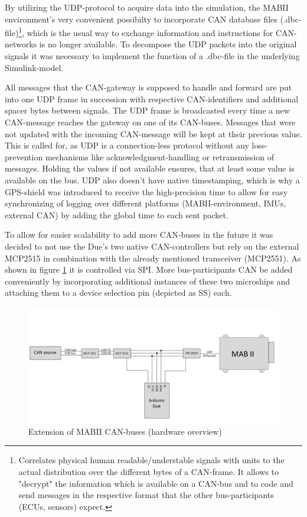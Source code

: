 \documentclass[ExampleMasters.tex]{subfiles}
\begin{document}
By utilizing the \gls{UDP}-protocol to acquire data into the simulation, the \gls{MABII} environment's very convenient possibilty to incorporate \gls{CAN} database files (.dbc-file)\footnote{Correlates physical human readable/understable signals with units to the actual distribution over the different bytes of a \gls{CAN}-frame. It allows to "decrypt" the information which is available on a \gls{CAN}-bus and to code and send messages in the respective format that the other bus-participants (ECUs, sensors) expect.}, which is the usual way to exchange information and instructions for \gls{CAN}-networks is no longer available. To decompose the \gls{UDP} packets into the original signals it was necessary to implement the function of a .dbc-file in the underlying Simulink-model. 

All messages that the CAN-gateway is supposed to handle and forward are put into one \gls{UDP} frame in succession with respective CAN-identifiers and additional spacer bytes between signals. The \gls{UDP} frame is broadcasted every time a new CAN-message reaches the gateway on one of its \gls{CAN}-buses. Messages that were not updated with the incoming \gls{CAN}-message will be kept at their previous value. This is called for, as \gls{UDP} is a connection-less protocol without any loss-prevention mechanisms like acknowledgment-handling or retransmission of messages. Holding the values if not available ensures, that at least some value is available on the bus. \gls{UDP} also doesn't have native timestamping, which is why a \gls{GPS}-shield was introduced to receive the high-precision time to allow for easy synchronizing of logging over different platforms (\gls{MABII}-environment, \gls{IMU}s, external \gls{CAN}) by adding the global time to each sent packet.

To allow for easier scalability to add more \gls{CAN}-buses in the future it was decided to not use the Due's two native CAN-controllers but rely on the external MCP2515 in combination with the already mentioned transceiver (MCP2551). As shown in figure \ref{fig:can_extension} it is controlled via \gls{SPI}. More bus-participants \gls{CAN} be added conveniently by incorporating additional instances of these two microships and attaching them to a device selection pin (depicted as SS) each.\\

\begin{figure}[!htb]
	\centering
	\includegraphics[width=1\linewidth]{figures/can_extension}
	\caption{Extension of \gls{MABII} \gls{CAN}-buses (hardware overview)}
	\label{fig:can_extension}
\end{figure}
\end{document}
